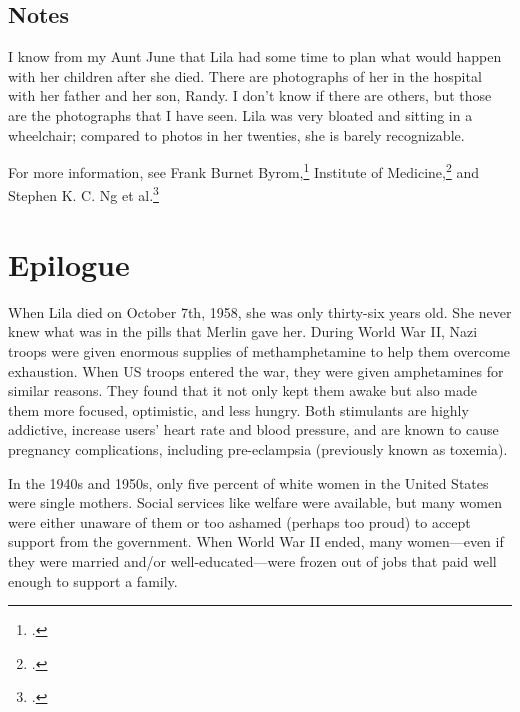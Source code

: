 \documentclass[
  american,
  letterpaper,
]{book}
\begin{document}
\section{Notes}\label{notes-59}

I know from my Aunt June that Lila had some time to plan what would
happen with her children after she died. There are photographs of her in
the hospital with her father and her son, Randy. I don't know if there
are others, but those are the photographs that I have seen. Lila was
very bloated and sitting in a wheelchair; compared to photos in her
twenties, she is barely recognizable.

For more information, see Frank Burnet Byrom,\footnote{.} Institute of Medicine,\footnote{.} and Stephen
K. C. Ng et al.\footnote{.}


\chapter{Epilogue}\label{epilogue}

When Lila died on October 7th, 1958, she was only thirty-six years old.
She never knew what was in the pills that Merlin gave her. During World
War II, Nazi troops were given enormous supplies of methamphetamine to
help them overcome exhaustion. When US troops entered the war, they were
given amphetamines for similar reasons. They found that it not only kept
them awake but also made them more focused, optimistic, and less hungry.
Both stimulants are highly addictive, increase users' heart rate and
blood pressure, and are known to cause pregnancy complications,
including pre-eclampsia (previously known as toxemia).

In the 1940s and 1950s, only five percent of white women in the United
States were single mothers. Social services like welfare were available,
but many women were either unaware of them or too ashamed (perhaps too
proud) to accept support from the government. When World War II ended,
many women---even if they were married and/or well-educated---were
frozen out of jobs that paid well enough to support a family.
\end{document}
